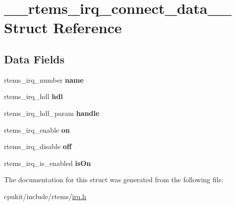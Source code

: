 \hypertarget{struct____rtems__irq__connect__data____}{}\section{\+\_\+\+\_\+rtems\+\_\+irq\+\_\+connect\+\_\+data\+\_\+\+\_\+ Struct Reference}
\label{struct____rtems__irq__connect__data____}
\subsection*{Data Fields}
\begin{DoxyCompactItemize}
\item 
\mbox{\label{struct____rtems__irq__connect__data_____a13aa284219d3ff78e1ef7d2cad7570b7}} 
rtems\+\_\+irq\+\_\+number {\bfseries name}
\item 
\mbox{\label{struct____rtems__irq__connect__data_____a2323cae9ab5c9d8025f9ecd60c0dbb23}} 
rtems\+\_\+irq\+\_\+hdl {\bfseries hdl}
\item 
\mbox{\label{struct____rtems__irq__connect__data_____a9aec81062804f9c7ee626943c2a5aa82}} 
rtems\+\_\+irq\+\_\+hdl\+\_\+param {\bfseries handle}
\item 
\mbox{\label{struct____rtems__irq__connect__data_____afed1a012382b498e7979a1d184817117}} 
rtems\+\_\+irq\+\_\+enable {\bfseries on}
\item 
\mbox{\label{struct____rtems__irq__connect__data_____a6156295dfe285bc7f64cf3c208759157}} 
rtems\+\_\+irq\+\_\+disable {\bfseries off}
\item 
\mbox{\label{struct____rtems__irq__connect__data_____a3eebb0c5bc3db03d3b023c90f9f8a71d}} 
rtems\+\_\+irq\+\_\+is\+\_\+enabled {\bfseries is\+On}
\end{DoxyCompactItemize}


The documentation for this struct was generated from the following file\+:\begin{DoxyCompactItemize}
\item 
cpukit/include/rtems/\mbox{\hyperlink{cpukit_2include_2rtems_2irq_8h}{irq.\+h}}\end{DoxyCompactItemize}
